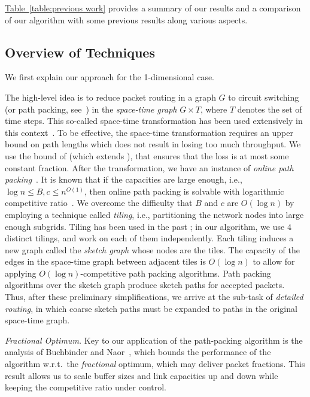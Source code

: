 \documentclass[11pt]{article}
\newcommand{\namedref}[2]{\hyperref[#2]{#1~\ref*{#2}}}
\newcommand{\tableref}[1]{\namedref{Table}{#1}}
\newenvironment{proof sketch}[1]{\noindent {\emph{Proof sketch of #1:}}}{\hfill \qed}
\begin{document}
\tableref{table:previous work} provides  a summary of our
results and a comparison of our algorithm with some
previous results along various aspects.


\newpage
\subsection{Overview of Techniques}\label{sec:tech}


We first explain
our approach  for the 1-dimensional case.


The high-level idea is to reduce packet routing in a graph
$G$ to circuit switching (or path packing,
see~\cite{KT,AAP}) in the \emph{space-time graph}  $G\times
T$, where $T$ denotes the set of time steps. This so-called
{space-time transformation} has been used extensively in
this context~\cite{AAF,ARSU,AZ,RR,
DBLP:conf/icalp/EvenM10,DBLP:conf/spaa/EvenM11,EM14}.
To be effective, the space-time
transformation requires an upper bound on path lengths which does not
result in losing too
much throughput. We use the bound of \cite{DBLP:conf/spaa/EvenM11, EM14}
(which extends \cite{AZ}),
that ensures that the loss is at most some constant fraction.
After the transformation, we have an instance of
\emph{online path packing}~\cite{AAP,
BN06}. It is known that if the capacities are
large enough, i.e., $\log n\le B,c\le n^{O(1)}$, then online path
packing is solvable with logarithmic competitive
ratio~\cite{AAP,DBLP:conf/icalp/EvenM10,DBLP:conf/spaa/EvenM11,EM14}. We overcome the difficulty that $B$ and $c$ are $O(\log n)$ by employing a technique
called \emph{tiling}, i.e., partitioning the network nodes into large enough subgrids.
Tiling has been used in the past
\cite{KT,BL,DBLP:conf/icalp/EvenM10,DBLP:conf/spaa/EvenM11,EM14}; in
our algorithm, we use $4$ distinct tilings, and work on each of them independently.  Each tiling induces a new graph called the
\emph{sketch graph} whose nodes are the tiles. The capacity of the edges in the
space-time graph between adjacent tiles is $O(\log n)$ to allow for applying $O(\log
n)$-competitive path packing algorithms.  Path packing algorithms over the sketch
graph produce sketch paths for accepted packets. Thus, after these preliminary
simplifications, we arrive at the sub-task of \emph{detailed routing}, in which
coarse sketch  paths must be expanded to paths in the original space-time graph.


\emph{Fractional Optimum.}
Key to our application of the path-packing algorithm is
the analysis of Buchbinder and Naor~\cite{BN06,BNsurvey}, which
bounds the performance of the algorithm w.r.t.\ the \emph{fractional}
optimum, which may deliver packet fractions.
This result allows us to scale buffer sizes and link
capacities up and down while keeping the competitive ratio
under control.
\end{document}
